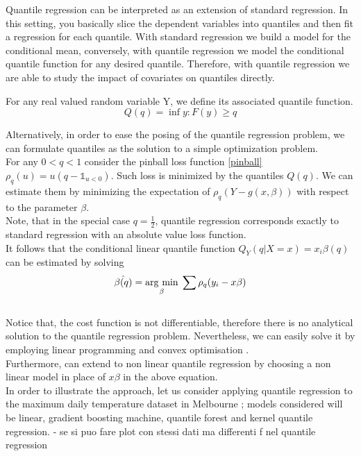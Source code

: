 Quantile regression can be interpreted as an extension of standard regression. In this setting, you basically slice the dependent variables into quantiles and then fit a regression for each quantile. With standard regression we build a model for the conditional mean, conversely, with quantile regression we model the conditional quantile function for any desired quantile. 
Therefore, with quantile regression we are able to study the impact of covariates on quantiles directly.
\begin{definition}
    For any real valued random variable Y, we define its associated quantile function.
    \begin{equation}
        Q(q)=\inf{y:F(y)\geq q}
    \end{equation}
\end{definition}
Alternatively, in order  to ease the posing of the quantile regression problem, we can formulate quantiles as the solution to a simple optimization problem.
\\
For any $0<q<1$ consider the pinball loss function \ref{pinball} $\rho_q(u)=u(q-\mathbb{1}_{u<0})$. 
Such loss is minimized by the quantiles $Q(q)$.
We can estimate them by minimizing the expectation of $\rho_q(Y-g(x,\beta))$ with respect to the parameter $\beta$.
\\
Note, that in the special case $q=\frac{1}{2}$,  quantile regression corresponds exactly to standard regression with an absolute value loss function.
\\
It follows that the conditional linear quantile function $Q_Y(q|X=x)=x_i\beta(q)$ can be estimated by solving
\begin{equation}\label{}
    \hat{\beta(q)}=\underset{\beta}{\operatorname{arg}\,\operatorname{min}}\;\sum \rho_q   (y_i-x \beta)
\end{equation}
\\
Notice that, the cost function is not differentiable, therefore there is no analytical solution to the quantile regression problem. Nevertheless, we can easily solve it by employing linear programming and convex optimisation \cite{boyd2004convex}.
\\
Furthermore, can extend to non linear quantile regression by choosing a non linear model in place of $x\beta$ in the above equation.
\\
In order to illustrate the approach, let us consider applying quantile regression to the maximum daily temperature dataset in Melbourne \cite{hyndman1996estimating}; models considered will be linear, gradient boosting machine, quantile forest\cite{meinshausen2006quantile} and kernel quantile regression.
- se si puo fare plot con stessi dati ma differenti f nel quantile regression